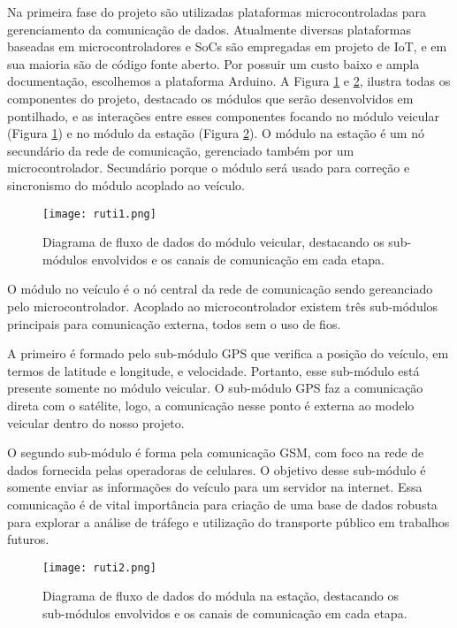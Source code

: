 \documentclass[12pt]{uftpibic}
\begin{document}
Na primeira fase do projeto são utilizadas plataformas microcontroladas para gerenciamento da comunicação de dados. Atualmente diversas plataformas baseadas em microcontroladores e SoCs são empregadas em projeto de IoT, e em sua maioria são de código fonte aberto. Por possuir um custo baixo e ampla documentação, escolhemos a plataforma Arduino. A Figura \ref{fig:projeto1} e \ref{fig:projeto2}, ilustra todas os componentes do projeto, destacado os módulos que serão desenvolvidos em pontilhado, e as interações entre esses componentes focando no módulo veicular (Figura \ref{fig:projeto1}) e no módulo da estação (Figura \ref{fig:projeto2}). O módulo na estação é um nó secundário da rede de comunicação, gerenciado também por um microcontrolador. Secundário porque o módulo será usado para correção e sincronismo do módulo acoplado ao veículo.

\begin{figure}[!htpb]
\centering
\caption{Diagrama de fluxo de dados do módulo veicular, destacando os sub-módulos envolvidos e os canais de comunicação em cada etapa.}
\texttt{[image: ruti1.png]}
\label{fig:projeto1}
\end{figure}

O módulo no veículo é o nó central da rede de comunicação sendo gereanciado pelo microcontrolador. Acoplado ao microcontrolador existem três sub-módulos principais para comunicação externa, todos sem o uso de fios. 

A primeiro é formado pelo sub-módulo GPS que verifica a posição do veículo, em termos de latitude e longitude, e velocidade. Portanto, esse sub-módulo está presente somente no módulo veicular. O sub-módulo GPS faz a comunicação direta com o satélite, logo, a comunicação nesse ponto é externa ao modelo veicular dentro do nosso projeto. 

O segundo sub-módulo é forma pela comunicação GSM, com foco na rede de dados fornecida pelas operadoras de celulares. O objetivo desse sub-módulo é somente enviar as informações do veículo para um servidor na internet. Essa comunicação é de vital importância para criação de uma base de dados robusta para explorar a análise de tráfego e utilização do transporte público em trabalhos futuros.

\begin{figure}[!htpb]
\centering
\caption{Diagrama de fluxo de dados do módula na estação, destacando os sub-módulos envolvidos e os canais de comunicação em cada etapa.}
\texttt{[image: ruti2.png]}
\label{fig:projeto2}
\end{figure}
\end{document}
